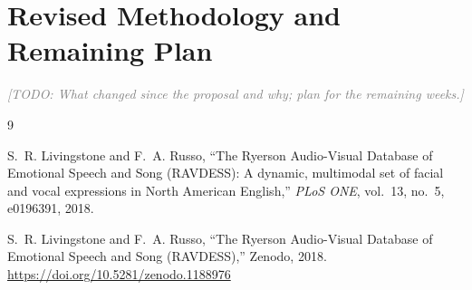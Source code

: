 \documentclass[10pt,a4paper,twocolumn]{article}
\newcommand{\todo}[1]{\textcolor{gray}{\textit{[TODO: #1]}}}
\begin{document}
\section{Revised Methodology and Remaining Plan}
\todo{What changed since the proposal and why; plan for the remaining weeks.}

{\small
\begin{thebibliography}{9}
\setlength{\itemsep}{0pt}

S.~R. Livingstone and F.~A. Russo, ``The Ryerson Audio-Visual Database of Emotional Speech and Song (RAVDESS): A dynamic, multimodal set of facial and vocal expressions in North American English,'' \emph{PLoS ONE}, vol.~13, no.~5, e0196391, 2018.

S.~R. Livingstone and F.~A. Russo, ``The Ryerson Audio-Visual Database of Emotional Speech and Song (RAVDESS),'' Zenodo, 2018. \url{https://doi.org/10.5281/zenodo.1188976}

\end{thebibliography}
}
\end{document}
